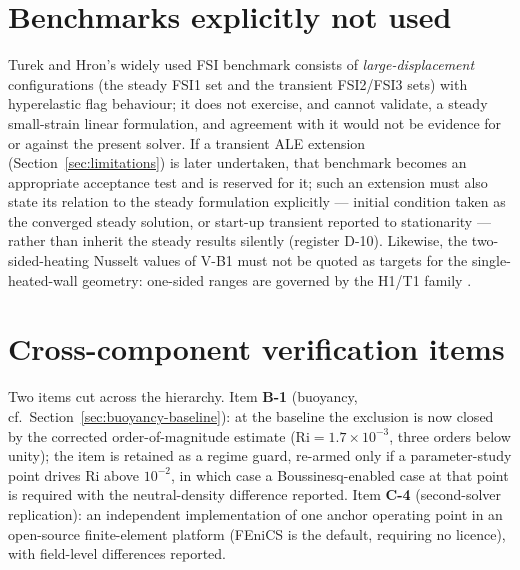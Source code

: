 \section{Benchmarks explicitly not used}
Turek and Hron's widely used FSI benchmark \cite{turek2006proposal} consists of
\emph{large-displacement} configurations (the steady FSI1 set and the transient FSI2/FSI3 sets)
with hyperelastic flag behaviour; it does not exercise, and cannot validate, a
steady small-strain linear formulation, and agreement with it would not be evidence for or against
the present solver. If a transient ALE extension (Section~\ref{sec:limitations}) is later
undertaken, that benchmark becomes an appropriate acceptance test and is reserved for it; such an
extension must also state its relation to the steady formulation explicitly --- initial condition
taken as the converged steady solution, or start-up transient reported to stationarity --- rather
than inherit the steady results silently (register D-10). Likewise,
the two-sided-heating Nusselt values of V-B1 must not be quoted as targets for the single-heated-wall
geometry: one-sided ranges are governed by the H1/T1 family \cite{shah1978laminar}.

\section{Cross-component verification items}
Two items cut across the hierarchy. Item \textbf{B-1} (buoyancy, cf.\
Section~\ref{sec:buoyancy-baseline}): at the baseline the exclusion is now closed by the
corrected order-of-magnitude estimate ($\mathrm{Ri}=1.7\times10^{-3}$, three orders below unity);
the item is retained as a regime guard, re-armed only if a parameter-study point drives
$\mathrm{Ri}$ above $10^{-2}$, in which case a Boussinesq-enabled case at that point is required
with the neutral-density difference reported. Item \textbf{C-4} (second-solver replication): an independent implementation of
one anchor operating point in an open-source finite-element platform (FEniCS is the default,
requiring no licence), with field-level differences reported.

